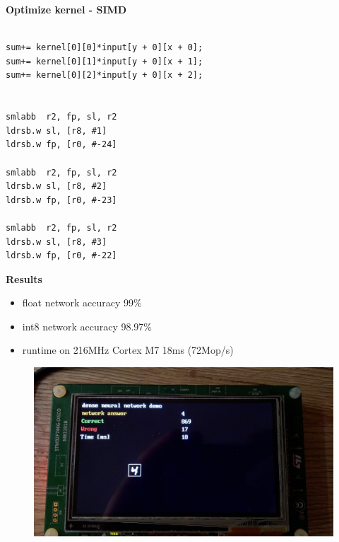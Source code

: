 \documentclass[xcolor=dvipsnames]{beamer}
\begin{document}
\begin{frame}[fragile]
{\bf Optimize kernel - SIMD}



\begin{lstlisting}

sum+= kernel[0][0]*input[y + 0][x + 0];
sum+= kernel[0][1]*input[y + 0][x + 1];
sum+= kernel[0][2]*input[y + 0][x + 2];


smlabb	r2, fp, sl, r2
ldrsb.w	sl, [r8, #1]
ldrsb.w	fp, [r0, #-24]

smlabb	r2, fp, sl, r2
ldrsb.w	sl, [r8, #2]
ldrsb.w	fp, [r0, #-23]

smlabb	r2, fp, sl, r2
ldrsb.w	sl, [r8, #3]
ldrsb.w	fp, [r0, #-22]

\end{lstlisting}


\end{frame}


\begin{frame}{\bf Results}

\begin{itemize}
\item float network accuracy 99\%
\item int8 network accuracy  98.97\%
\item runtime on 216MHz Cortex M7 18ms (72Mop/s)
\end{itemize}

\begin{figure}
  \includegraphics[scale=0.25]{../pictures/stm32_screenshot.jpg}
\end{figure}

\end{frame}
\end{document}
